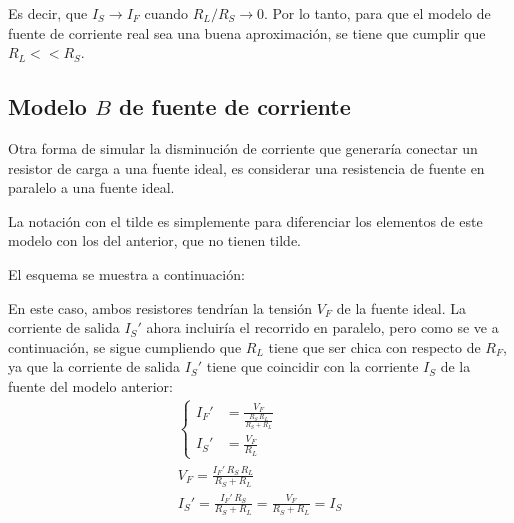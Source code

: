 \documentclass[a5paper,12pt,twoside]{book}
\begin{document}
Es decir, que $I_S \to I_F$ cuando $R_L/R_S \to 0$. Por lo tanto, para que el modelo de fuente de corriente real sea una buena aproximación, se tiene que cumplir que $R_L<<R_S$.

\begin{center}
    \def\svgwidth{0.6\linewidth}
    
\end{center}


\subsection*{Modelo $B$ de fuente de corriente}

Otra forma de simular la disminución de corriente que generaría conectar un resistor de carga a una fuente ideal, es considerar una resistencia de fuente en paralelo a una fuente ideal.

La notación con el tilde es simplemente para diferenciar los elementos de este modelo con los del anterior, que no tienen tilde.

El esquema se muestra a continuación:

\begin{multicols}{2}
    \begin{center}
        \def\svgwidth{0.9\linewidth}
        
    \end{center}
    \begin{center}
        \def\svgwidth{0.9\linewidth}
        
    \end{center}
\end{multicols}

En este caso, ambos resistores tendrían la tensión $V_F$ de la fuente ideal. La corriente de salida $I_S'$ ahora incluiría el recorrido en paralelo, pero como se ve a continuación, se sigue cumpliendo que $R_L$ tiene que ser chica con respecto de $R_F$, ya que la corriente de salida $I_S'$ tiene que coincidir con la corriente $I_S$ de la fuente del modelo anterior:
\begin{gather*}
    \left\{
    \begin{aligned}
        I_F' &= \frac{V_F}{\frac{R_S \, R_L}{R_S + R_L}}
        \\[1ex]
        I_S' &= \frac{V_F}{R_L}
    \end{aligned}
    \right.
    \\[1em]
    V_F = \frac{I_F' \, R_S \, R_L}{R_S + R_L}
    \\[1em]
    I_S' = \frac{I_F' \, R_S}{R_S + R_L} = \frac{V_F}{R_S + R_L} = I_S
\end{gather*}
\end{document}
